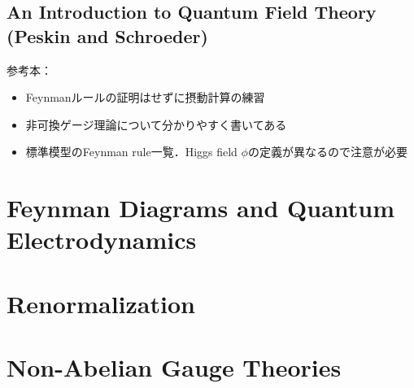 \documentclass[a4paper]{ltjsreport}
\begin{document}
\chapter*{An Introduction to Quantum Field Theory (Peskin and Schroeder)}
参考本：
\begin{itemize}
  \item \cite{griffiths2020introduction} Feynmanルールの証明はせずに摂動計算の練習
  \item \cite{坂本眞人2020量子力学選書} 非可換ゲージ理論について分かりやすく書いてある
  \item \cite{romao2012resource} 標準模型のFeynman rule一覧．Higgs field \(\phi\)の定義が異なるので注意が必要
\end{itemize}

\printbibliography
\tableofcontents

\part{Feynman Diagrams and Quantum Electrodynamics}





\part{Renormalization}




\part{Non-Abelian Gauge Theories}







% 
\end{document}
